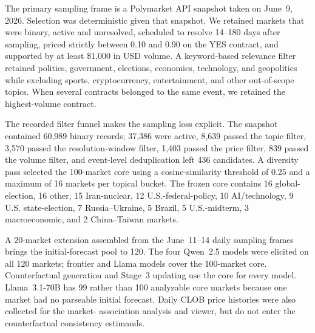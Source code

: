 The primary sampling frame is a Polymarket API snapshot taken on June~9, 2026.
Selection was deterministic given that snapshot.  We retained markets that were
binary, active and unresolved, scheduled to resolve 14--180 days after sampling,
priced strictly between 0.10 and 0.90 on the YES contract, and supported by at least
\$1,000 in USD volume.  A keyword-based relevance filter retained politics,
government, elections, economics, technology, and geopolitics while excluding
sports, cryptocurrency, entertainment, and other out-of-scope topics.  When several
contracts belonged to the same event, we retained the highest-volume contract.

The recorded filter funnel makes the sampling loss explicit.  The snapshot contained
60,989 binary records; 37,386 were active, 8,639 passed the topic filter, 3,570 passed
the resolution-window filter, 1,403 passed the price filter, 839 passed the volume
filter, and event-level deduplication left 436 candidates.  A diversity pass selected
the 100-market core using a cosine-similarity threshold of 0.25 and a maximum of
16 markets per topical bucket.  The frozen core contains 16 global-election,
16 other, 15 Iran-nuclear, 12 U.S.-federal-policy, 10 AI/technology, 9 U.S.
state-election, 7 Russia--Ukraine, 5 Brazil, 5 U.S.-midterm, 3 macroeconomic,
and 2 China--Taiwan markets.

A 20-market extension assembled from the June~11--14 daily sampling frames brings the
initial-forecast pool to 120.  The four Qwen~2.5 models were elicited on all 120
markets; frontier and Llama models cover the 100-market core.  Counterfactual
generation and Stage~3 updating use the core for every model.  Llama~3.1-70B has
99 rather than 100 analyzable core markets because one market had no parseable
initial forecast.  Daily CLOB price histories were also collected for the market-
association analysis and viewer, but do not enter the counterfactual consistency
estimands.

